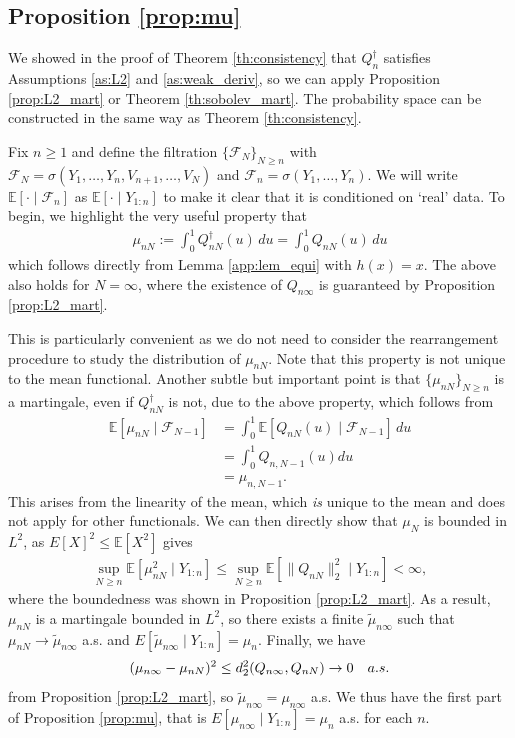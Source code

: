 \documentclass[11pt,a4paper]{article}
\newcommand{\E}{\mathbb{E}}
\begin{document}
\begin{appendices}
\subsection{Proposition \ref{prop:mu}}
We showed in the proof of {Theorem \ref{th:consistency}} that $Q_n^{\dagger}$ satisfies {Assumptions \ref{as:L2}} and {\ref{as:weak_deriv}}, so we can apply {Proposition \ref{prop:L2_mart}} or {Theorem \ref{th:sobolev_mart}}. The probability space can be constructed in the same way as {Theorem \ref{th:consistency}}.

Fix $n\geq 1$ and define the filtration $\{\mathcal{F}_N\}_{N \geq n}$ with $\mathcal{F}_N = \sigma(Y_1,\ldots,Y_n,V_{n+1},\ldots,V_N)$ and $\mathcal{F}_n =\sigma(Y_1,\ldots,Y_n)$. We will write $\E[\cdot \mid \mathcal{F}_n]$ as $\E[\cdot \mid Y_{1:n}]$ to make it clear that it is conditioned on `real' data.
To begin, we highlight the very useful property that
\begin{align*}
  \mu_{nN} :=  \int_0^1 Q_{nN}^{\dagger}(u)\, du  = \int_0^1 Q_{nN}(u)\, du
\end{align*}
which follows directly from {Lemma \ref{app:lem_equi}} with $h(x) = x$. The above also holds for $N = \infty$, where the existence of $Q_{n\infty}$ is guaranteed by {Proposition \ref{prop:L2_mart}}.

This is particularly convenient as we do not need to consider the rearrangement procedure to study the distribution of $\mu_{nN}$.
Note that this property is not unique to the mean functional. Another subtle but important point is that $\{\mu_{nN}\}_{N\geq n}$ is a martingale, even if $Q_{nN}^{\dagger}$ is not, due to the above property, which follows from
\begin{align*}
    \E\left[\mu_{nN} \mid \mathcal{F}_{N-1}\right]
    &=\int_0^1\E\left[Q_{nN}(u) \mid \mathcal{F}_{N-1}\right]\, du\\&=\int_0^1 Q_{n,N-1}(u) du\\&=\mu_{n,N-1}.
\end{align*}
This arises from the linearity of the mean, which\textit{ is} unique to the mean and does not apply for other functionals. We can then directly show that $\mu_N$ is bounded in $L^2$, as $E[X]^2 \leq\E[X^2]$ gives 
\begin{align*}
\sup_{N\geq n} \E\left[\mu_{nN}^2 \mid Y_{1:n}\right] \leq \sup_{N\geq n} \E\left[\|Q_{nN}\|^2_2\mid Y_{1:n} \right] < \infty, 
\end{align*}
where the boundedness was shown in {Proposition \ref{prop:L2_mart}}. As a result, $\mu_{nN}$ is a martingale bounded in $L^2$, so there exists a finite $\tilde{\mu}_{n\infty}$ such that  $\mu_{nN} \to \tilde{\mu}_{n\infty}$ a.s. and $E[\tilde{\mu}_{n\infty} \mid Y_{1:n}] = \mu_n$. 
Finally, we have
\begin{align*}
    (\mu_{n\infty} - \mu_{nN})^2 \leq d_2^2(Q_{n\infty},Q_{nN}) \to 0 \quad \textnormal{a.s.}
\end{align*}
from {Proposition \ref{prop:L2_mart}}, so $\tilde{\mu}_{n\infty} = \mu_{n\infty}$ a.s.
We thus have the first part of {Proposition \ref{prop:mu}}, that is $E[\mu_{n\infty} \mid Y_{1:n}] = \mu_n$ a.s. for each $n$. 


\end{appendices}
\end{document}
